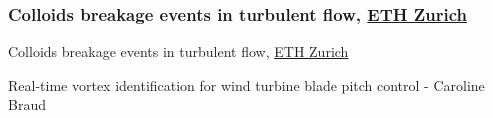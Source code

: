 \begin{frame}[label=app-31]
    \frametitle{Colloids breakage events in turbulent flow, \href{https://www.dropbox.com/s/aufwfraotj5rll7/colloids1.mp4?raw=1}{ETH Zurich}}
\end{frame}
    
    
\begin{frame}[label=app-3a]{Colloids breakage events in turbulent flow, \href{https://www.dropbox.com/s/8cimpwfsukf11u2/colloids2.mp4?raw=1}{ETH Zurich}}
    \end{frame}
    
    
\begin{frame}[label=app-5]{Real-time vortex identification for wind turbine blade pitch control - Caroline Braud}
    \begin{multicols*}{2}
    \end{multicols*}
\end{frame}
    
